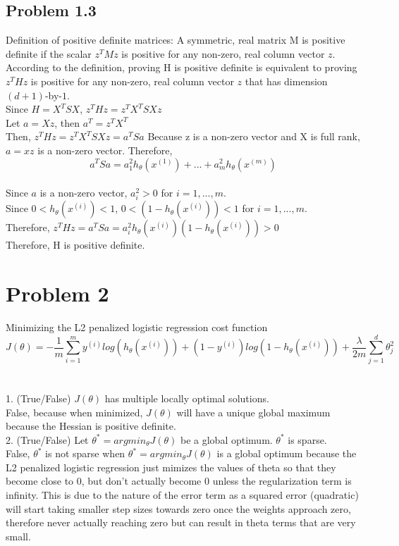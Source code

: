 \documentclass[12pt]{article}
\begin{document}
\subsection*{Problem 1.3}
Definition of positive definite matrices: A symmetric, real matrix M is positive definite if the scalar $z^{T}Mz$ is positive for any non-zero, real column vector $z$.\\[0.5cm]
According to the definition, proving H is positive definite is equivalent to proving $z^{T}Hz$ is positive for any non-zero, real column vector $z$ that has dimension $(d+1)$-by-$1$.\\[0.5cm]
Since $H = X^{T} S X $, $z^{T}Hz = z^{T} X^{T} S X z$\\
Let $a = Xz$, then $a^{T} = z^{T}X^{T}$\\
Then, $z^{T}Hz = z^{T} X^{T} S X z = a^{T} S a$
Because z is a non-zero vector and X is full rank, $a = xz$ is a non-zero vector. Therefore,\\
$$a^{T} S a   = a_1^{2} h_\theta (x^{(1)}) + ... + a_m^{2} h_\theta (x^{(m)}) $$\\
Since $a$ is a non-zero vector, $a_i^{2} > 0$ for $i = 1, ..., m$.\\
Since $0 < h_\theta (x^{(i)}) < 1$, $0 < (1-h_\theta (x^{(i)})) < 1$ for $i = 1, ..., m$.\\
Therefore, $z^{T}Hz = a^{T} S a = a_i^{2} h_\theta (x^{(i)}) (1-h_\theta (x^{(i)})) > 0$\\
Therefore, H is positive definite.




\section*{Problem 2}
Minimizing the L2 penalized logistic regression cost function
$$J(\theta) = - \frac{1}{m}\sum_{i=1}^my^{(i)}log(h_\theta(x^{(i)})) + (1 - y^{(i)})log(1-h_\theta(x^{(i)})) + \frac{\lambda}{2m}\sum_{j=1}^d\theta_j^2$$\\
\\
1. (True/False) $J(\theta)$ has multiple locally optimal solutions.\\
False, because when minimized, $J(\theta)$ will have a unique global maximum because the Hessian is positive definite.\\

2. (True/False) Let $\theta^* = argmin_\theta J(\theta)$ be a global optimum. $\theta^*$ is sparse.\\
False, $\theta^*$ is not sparse when $\theta^* = argmin_\theta J(\theta)$ is a global optimum because the L2 penalized logistic regression just mimizes the values of theta so that they become close to 0, but don't actually become 0 unless the regularization term is infinity. This is due to the nature of the error term as a squared error (quadratic) will start taking smaller step sizes towards zero once the weights approach zero, therefore never actually reaching zero but can result in theta terms that are very small. \\
\end{document}
